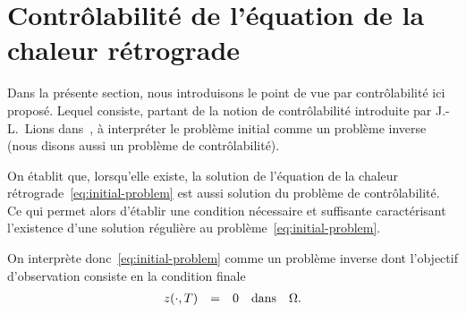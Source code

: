 \section{Contrôlabilité de l'équation de la chaleur
rétrograde}\label{sec:controllability}

Dans la présente section, nous introduisons le point de vue par
contrôlabilité ici proposé. Lequel consiste, partant de la notion de
contrôlabilité introduite par J.-L.~Lions dans~\cite[222]{lions1}, à
interpréter le problème initial comme un problème inverse (nous disons
aussi un problème de contrôlabilité).

On établit que, lorsqu'elle existe, la solution de l'équation de la chaleur
rétrograde~\eqref{eq:initial-problem} est aussi solution du problème de
contrôlabilité. Ce qui permet alors d'établir une condition nécessaire et
suffisante caractérisant l'existence d'une solution régulière au
problème~\eqref{eq:initial-problem}.

On interprète donc~\eqref{eq:initial-problem} comme un problème inverse
dont l'objectif d'observation consiste en la condition finale
\begin{equation*}
    \begin{array}{rclll}
        {z}\!\left({\cdot,T}\right) & = & 0 & \text{dans} & \Omega.
    \end{array}
\end{equation*}

